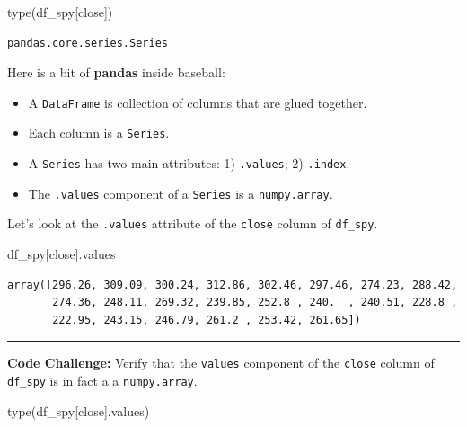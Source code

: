 \documentclass[
  letterpaper,
  DIV=11,
  numbers=noendperiod]{scrreprt}
\newenvironment{Shaded}{\begin{snugshade}}{\end{snugshade}}
\newcommand{\BuiltInTok}[1]{\textcolor[rgb]{0.00,0.23,0.31}{#1}}
\newcommand{\NormalTok}[1]{\textcolor[rgb]{0.00,0.23,0.31}{#1}}
\newcommand{\StringTok}[1]{\textcolor[rgb]{0.13,0.47,0.30}{#1}}
\begin{document}
\begin{Shaded}
\begin{Highlighting}[]
\BuiltInTok{type}\NormalTok{(df\_spy[}\StringTok{\textquotesingle{}close\textquotesingle{}}\NormalTok{])}
\end{Highlighting}
\end{Shaded}

\begin{verbatim}
pandas.core.series.Series
\end{verbatim}

Here is a bit of \textbf{pandas} inside baseball:

\begin{itemize}
\item
  A \texttt{DataFrame} is collection of columns that are glued together.
\item
  Each column is a \texttt{Series}.
\item
  A \texttt{Series} has two main attributes: 1) \texttt{.values}; 2)
  \texttt{.index}.
\item
  The \texttt{.values} component of a \texttt{Series} is a
  \texttt{numpy.array}.
\end{itemize}

Let's look at the \texttt{.values} attribute of the \texttt{close}
column of \texttt{df\_spy}.

\begin{Shaded}
\begin{Highlighting}[]
\NormalTok{df\_spy[}\StringTok{\textquotesingle{}close\textquotesingle{}}\NormalTok{].values}
\end{Highlighting}
\end{Shaded}

\begin{verbatim}
array([296.26, 309.09, 300.24, 312.86, 302.46, 297.46, 274.23, 288.42,
       274.36, 248.11, 269.32, 239.85, 252.8 , 240.  , 240.51, 228.8 ,
       222.95, 243.15, 246.79, 261.2 , 253.42, 261.65])
\end{verbatim}

\begin{center}\rule{0.5\linewidth}{0.5pt}\end{center}

\textbf{Code Challenge:} Verify that the \texttt{values} component of
the \texttt{close} column of \texttt{df\_spy} is in fact a a
\texttt{numpy.array}.

\begin{Shaded}
\begin{Highlighting}[]
\BuiltInTok{type}\NormalTok{(df\_spy[}\StringTok{\textquotesingle{}close\textquotesingle{}}\NormalTok{].values)}
\end{Highlighting}
\end{Shaded}
\end{document}
